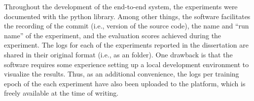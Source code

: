
Throughout the development of the end-to-end system, the
experiments were documented with the 
 python library. Among other
things, the software facilitates the recording of the
 commit (i.e., version of the source code), the
name and ``run name'' of the experiment, and the evaluation
scores achieved during the experiment. The logs for each of
the experiments reported in the dissertation are shared in
their original  format (i.e., as an
 folder). One drawback is that the software
requires some experience setting up a local development
environment to visualize the results. Thus, as an additional
convenience, the logs per training epoch of the each
experiment have also been uploaded to the
platform, which is
freely available at the time of writing.
